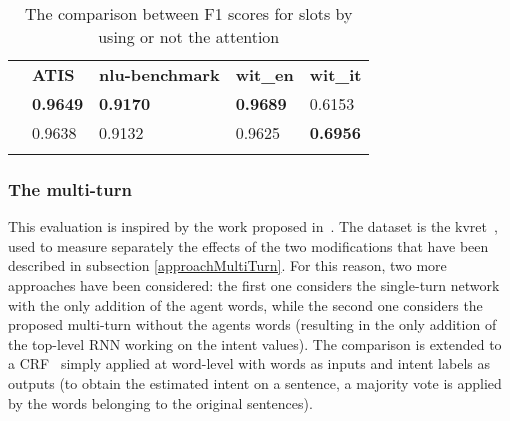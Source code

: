 
\begin{table}[H]
 			\centering
\begin{tabular}{p{1.05in}p{1.05in}p{1.05in}p{1.05in}p{1.05in}}
\hline
\multicolumn{1}{|p{1.05in}}{} & 
\multicolumn{1}{|p{1.05in}}{\textbf{ATIS}} & 
\multicolumn{1}{|p{1.05in}}{\textbf{nlu-benchmark}} & 
\multicolumn{1}{|p{1.05in}}{\textbf{wit\_en}} & 
\multicolumn{1}{|p{1.05in}|}{\textbf{wit\_it}} \\
\hhline{-----}
\multicolumn{1}{|p{1.05in}}{With attention} & 
\multicolumn{1}{|p{1.05in}}{\textbf{0.9649}} & 
\multicolumn{1}{|p{1.05in}}{\textbf{0.9170}} & 
\multicolumn{1}{|p{1.05in}}{\textbf{0.9689}} & 
\multicolumn{1}{|p{1.05in}|}{0.6153} \\
\hhline{-----}
\multicolumn{1}{|p{1.05in}}{Without attention} & 
\multicolumn{1}{|p{1.05in}}{0.9638} & 
\multicolumn{1}{|p{1.05in}}{0.9132} & 
\multicolumn{1}{|p{1.05in}}{0.9625} & 
\multicolumn{1}{|p{1.05in}|}{\textbf{0.6956}} \\
\hhline{-----}

\end{tabular}
 \caption{The comparison between F1 scores for slots by using or not the attention}\label{tab:attentionVsNot}
\end{table}
%

\subsubsection{The multi-turn}
This evaluation is inspired by the work proposed in~\cite{mensio2018multi}. The dataset is the kvret~\cite{eric2017key}, used to measure separately the effects of the two modifications that have been described in subsection \ref{approachMultiTurn}. For this reason, two more approaches have been considered: the first one considers the single-turn network with the only addition of the agent words, while the second one considers the proposed multi-turn without the agents words (resulting in the only addition of the top-level RNN working on the intent values). The comparison is extended to a CRF~\cite{lafferty2001conditional} simply applied at word-level with words as inputs and intent labels as outputs (to obtain the estimated intent on a sentence, a majority vote is applied by the words belonging to the original sentences). 

